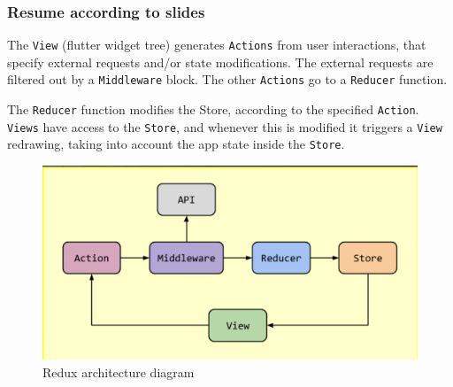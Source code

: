 \subsubsection{Resume according to slides}
The \texttt{View} (flutter widget tree) generates \texttt{Actions} from user interactions, that specify
external requests and/or state modifications. The external requests are filtered out
by a \texttt{Middleware} block. The other \texttt{Actions} go to a \texttt{Reducer} function.

The \texttt{Reducer} function modifies the Store, according to the specified \texttt{Action}.
\texttt{Views} have access to the \texttt{Store}, and whenever this is modified it triggers a \texttt{View}
redrawing, taking into account the app state inside the \texttt{Store}.

\begin{figure}[h]
\centering
\includegraphics[width=0.8\linewidth]{figures/11_redux_diagram.png}
\caption{Redux architecture diagram}
\label{fig:redux_architecture_diagram}
\end{figure}
